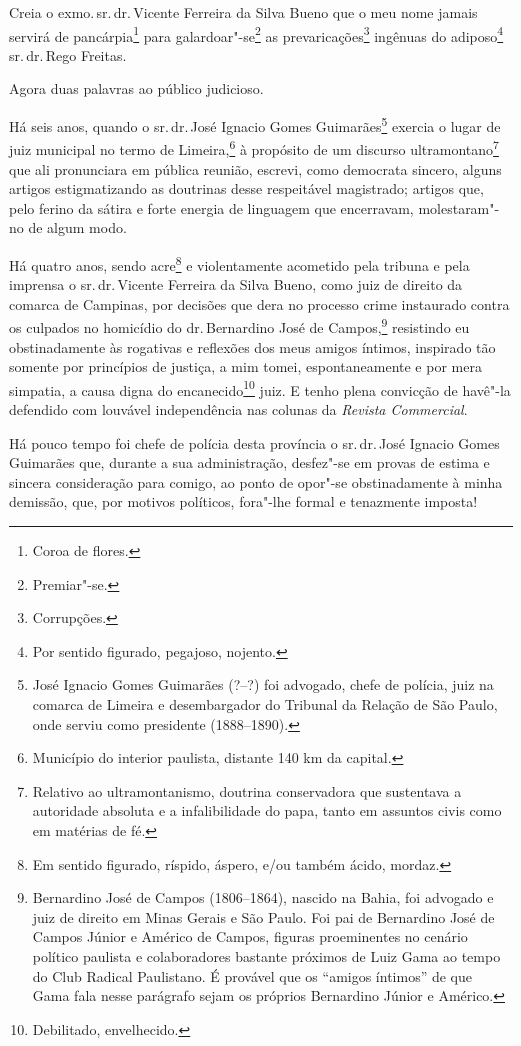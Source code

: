 Creia o exmo.\,sr.\,dr.\,Vicente Ferreira da Silva Bueno que o meu nome
jamais servirá de pancárpia\footnote{Coroa de flores.} para
galardoar"-se\footnote{Premiar"-se.} as prevaricações\footnote{
  Corrupções.} ingênuas do adiposo\footnote{Por sentido figurado,
  pegajoso, nojento.} sr.\,dr.\,Rego Freitas.

Agora duas palavras ao público judicioso.

Há seis anos, quando o sr.\,dr.\,José Ignacio Gomes Guimarães\footnote{
  José Ignacio Gomes Guimarães (?--?) foi advogado, chefe de polícia,
  juiz na comarca de Limeira e desembargador do Tribunal da Relação de
  São Paulo, onde serviu como presidente (1888--1890).} exercia o lugar
de juiz municipal no termo de Limeira,\footnote{Município do interior
  paulista, distante 140 km da capital.} à propósito de um discurso
ultramontano\footnote{Relativo ao ultramontanismo, doutrina
  conservadora que sustentava a autoridade absoluta e a infalibilidade
  do papa, tanto em assuntos civis como em matérias de fé.} que ali
pronunciara em pública reunião, escrevi, como democrata sincero, alguns
artigos estigmatizando as doutrinas desse respeitável magistrado;
artigos que, pelo ferino da sátira e forte energia de linguagem que
encerravam, molestaram"-no de algum modo.

Há quatro anos, sendo acre\footnote{Em sentido figurado, ríspido,
  áspero, e/ou também ácido, mordaz.} e violentamente acometido pela
tribuna e pela imprensa o sr.\,dr.\,Vicente Ferreira da Silva Bueno, como
juiz de direito da comarca de Campinas, por decisões que dera no
processo crime instaurado contra os culpados no homicídio do dr.\,Bernardino José de Campos,\footnote{Bernardino José de Campos
  (1806--1864), nascido na Bahia, foi advogado e juiz de direito em Minas
  Gerais e São Paulo. Foi pai de Bernardino José de Campos Júnior e
  Américo de Campos, figuras proeminentes no cenário político paulista e
  colaboradores bastante próximos de Luiz Gama ao tempo do Club Radical
  Paulistano. É provável que os ``amigos íntimos'' de que Gama fala nesse
  parágrafo sejam os próprios Bernardino Júnior e Américo.} resistindo
eu obstinadamente às rogativas e reflexões dos meus amigos íntimos,
inspirado tão somente por princípios de justiça, a mim tomei,
espontaneamente e por mera simpatia, a causa digna do
encanecido\footnote{Debilitado, envelhecido.} juiz. E tenho plena
convicção de havê"-la defendido com louvável independência nas colunas da
\emph{Revista Commercial}.

Há pouco tempo foi chefe de polícia desta província o sr.\,dr.\,José
Ignacio Gomes Guimarães que, durante a sua administração, desfez"-se em
provas de estima e sincera consideração para comigo, ao ponto de opor"-se
obstinadamente à minha demissão, que, por motivos políticos, fora"-lhe
formal e tenazmente imposta!

